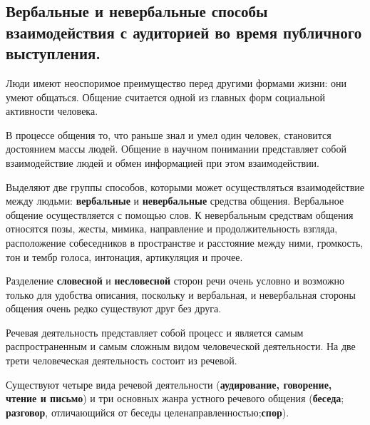 \documentclass[a4paper,12pt]{article}
\begin{document}
\begin{large}

\setlength{\parindent}{20pt} %
\section{Вербальные и невербальные способы взаимодействия с аудиторией во время публичного выступления.}

\hspace{\parindent}Люди имеют неоспоримое преимущество перед другими формами жизни: они умеют общаться. 
Общение считается одной из главных форм социальной активности человека. 

 В процессе общения то, что раньше знал и умел один человек, становится достоянием массы
 людей. 
 Общение в научном понимании представляет собой взаимодействие людей и обмен
 информацией при этом взаимодействии.

 Выделяют две группы способов, которыми может осуществляться взаимодействие между людьми: \textbf{вербальные} и \textbf{невербальные} средства общения. Вербальное общение осуществляется с помощью слов. К невербальным средствам общения относятся позы, жесты, мимика, направление и продолжительность взгляда, расположение собеседников в пространстве и расстояние между ними, громкость, тон и тембр голоса, интонация,
 артикуляция и прочее.
 
 Разделение \textbf{словесной} и \textbf{несловесной} сторон речи очень условно и возможно только для удобства описания, поскольку и вербальная, и невербальная стороны общения очень редко существуют друг без друга.
 
 Речевая деятельность представляет собой процесс и является самым распространенным и самым сложным видом человеческой деятельности. На две трети человеческая деятельность
 состоит из речевой.

 Существуют четыре вида речевой деятельности (\textbf{аудирование, говорение, чтение и письмо}) и три основных жанра устного речевого общения (\textbf{беседа}; \textbf{разговор}, отличающийся от беседы целенаправленностью;\textbf{спор}).


\end{large}
\end{document}
